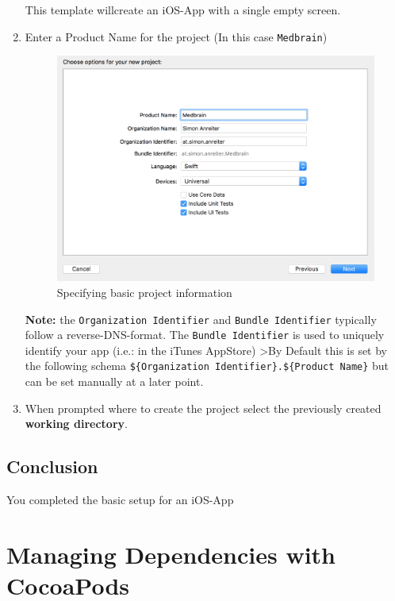 \documentclass{article}
\begin{document}
\begin{enumerate}
  This template willcreate an iOS-App with a single empty screen.

\item
  Enter a Product Name for the project (In this case \texttt{Medbrain})

  \begin{figure}[H]
  \centering
  \includegraphics[width=\linewidth]{resources/step1/step_1_3.png}
  \caption{Specifying basic project information}
  \label{fig:basic_product_information}
  \end{figure}

  \textbf{Note:} the \texttt{Organization\ Identifier} and
  \texttt{Bundle\ Identifier} typically follow a reverse-DNS-format.
  The \texttt{Bundle\ Identifier} is used to uniquely
  identify your app (i.e.: in the iTunes AppStore) \textgreater{}By
  Default this is set by the following schema
  \texttt{\$\{Organization\ Identifier\}.\$\{Product\ Name\}} but can be
  set manually at a later point.
\item
  When prompted where to create the project select the previously
  created \textbf{working directory}.
\end{enumerate}

\subsection{Conclusion}\label{step1:conclusion}

You completed the basic setup for an iOS-App


\section{Managing Dependencies with
CocoaPods}\label{step2}
\end{document}
